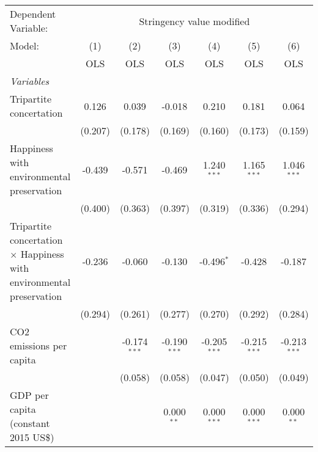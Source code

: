 
\begingroup
\centering
\begin{tabular}{lcccccc}
   \toprule
   Dependent Variable: & \multicolumn{6}{c}{Stringency value modified}\\
   Model:                                                                      & (1)     & (2)            & (3)            & (4)            & (5)            & (6)\\  
                                                                               &  OLS    & OLS            & OLS            & OLS            & OLS            & OLS\\  
   \midrule
   \emph{Variables}\\
   Tripartite concertation                                                     & 0.126   & 0.039          & -0.018         & 0.210          & 0.181          & 0.064\\   
                                                                               & (0.207) & (0.178)        & (0.169)        & (0.160)        & (0.173)        & (0.159)\\   
   Happiness with environmental preservation                                   & -0.439  & -0.571         & -0.469         & 1.240$^{***}$  & 1.165$^{***}$  & 1.046$^{***}$\\   
                                                                               & (0.400) & (0.363)        & (0.397)        & (0.319)        & (0.336)        & (0.294)\\   
   Tripartite concertation $\times$ Happiness with environmental preservation  & -0.236  & -0.060         & -0.130         & -0.496$^{*}$   & -0.428         & -0.187\\   
                                                                               & (0.294) & (0.261)        & (0.277)        & (0.270)        & (0.292)        & (0.284)\\   
   CO2 emissions per capita                                                    &         & -0.174$^{***}$ & -0.190$^{***}$ & -0.205$^{***}$ & -0.215$^{***}$ & -0.213$^{***}$\\   
                                                                               &         & (0.058)        & (0.058)        & (0.047)        & (0.050)        & (0.049)\\   
   GDP per capita (constant 2015 US\$)                                         &         &                & 0.000$^{**}$   & 0.000$^{***}$  & 0.000$^{***}$  & 0.000$^{**}$\\   

\end{tabular}
